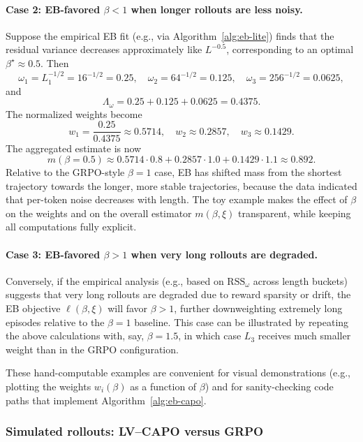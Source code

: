 \paragraph{Case 2: EB-favored \(\beta<1\) when longer rollouts are less noisy.}
Suppose the empirical EB fit (e.g., via Algorithm~\ref{alg:eb-lite}) finds that the residual variance decreases approximately like \(L^{-0.5}\), corresponding to an optimal \(\beta^\star\approx 0.5\).
Then
\[
\omega_1=L_1^{-1/2}=16^{-1/2}=0.25,\quad
\omega_2=64^{-1/2}=0.125,\quad
\omega_3=256^{-1/2}=0.0625,
\]
and
\[
\Lambda_\omega=0.25+0.125+0.0625=0.4375.
\]
The normalized weights become
\[
w_1=\frac{0.25}{0.4375}\approx 0.5714,\quad
w_2\approx 0.2857,\quad
w_3\approx 0.1429.
\]
The aggregated estimate is now
\[
m(\beta=0.5)
\approx 0.5714\cdot 0.8 + 0.2857\cdot 1.0 + 0.1429\cdot 1.1
\approx 0.892.
\]
Relative to the GRPO-style \(\beta=1\) case, EB has shifted mass from the shortest trajectory towards the longer, more stable trajectories, because the data indicated that per-token noise decreases with length.
The toy example makes the effect of \(\beta\) on the weights and on the overall estimator \(m(\beta,\xi)\) transparent, while keeping all computations fully explicit.

\paragraph{Case 3: EB-favored \(\beta>1\) when very long rollouts are degraded.}
Conversely, if the empirical analysis (e.g., based on \(\mathrm{RSS}_\omega\) across length buckets) suggests that very long rollouts are degraded due to reward sparsity or drift, the EB objective \(\ell(\beta,\xi)\) will favor \(\beta>1\), further downweighting extremely long episodes relative to the \(\beta=1\) baseline.
This case can be illustrated by repeating the above calculations with, say, \(\beta=1.5\), in which case \(L_3\) receives much smaller weight than in the GRPO configuration.

These hand-computable examples are convenient for visual demonstrations (e.g., plotting the weights \(w_i(\beta)\) as a function of \(\beta\)) and for sanity-checking code paths that implement Algorithm~\ref{alg:eb-capo}.

\subsubsection{Simulated rollouts: LV--CAPO versus GRPO}
\label{sec:simulated-eb-vs-grpo}


